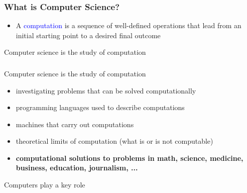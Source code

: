 \documentclass{beamer}
\begin{document}
\begin{frame}
  \frametitle{What is Computer Science?}
	\begin{itemize}
		\item A \textcolor{blue}{computation} is a sequence of well-defined operations that lead from an initial starting point to a desired final outcome
    \end{itemize}
    \pause
    \begin{block}{\centering \Large{Computer science is the study of computation}}
    \end{block}
\end{frame}
\begin{frame}
  \frametitle{}
  Computer science is the study of computation
  \pause
  	\begin{itemize}
		\item investigating problems that can be solved computationally \pause
		\item programming languages used to describe computations \pause
		\item machines that carry out computations \pause
		\item theoretical limits of computation (what is or is not computable) \pause
		\item \textbf{computational solutions to problems in math, science, medicine,  business, education, journalism, ...} \pause
    \end{itemize}
    
Computers play a key role
\end{frame}
\end{document}

